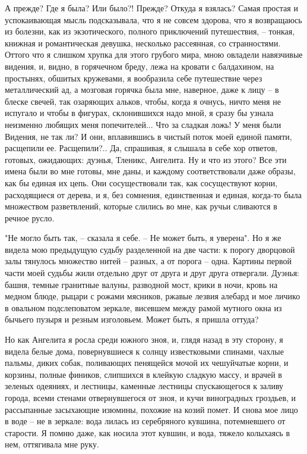 А прежде? Где я была?  Или  было?!  Прежде?  Откуда  я  взялась?  Самая
простая  и  успокаивающая мысль подсказывала, что я не совсем здорова, что я
возвращаюсь  из  болезни,  как   из   экзотического,   полного   приключений
путешествия,   --   тонкая,   книжная  и  романтическая  девушка,  несколько
рассеянная, со странностями. Оттого что я слишком хрупка для  этого  грубого
мира,  мною  овладели навязчивые видения, и, видно, в горячечном бреду, лежа
на кровати с балдахином, на простынях, обшитых кружевами, я вообразила  себе
путешествие  через  металлический ад, а мозговая горячка была мне, наверное,
даже к лицу -- в блеске свечей, так озаряющих альков, чтобы, когда я очнусь,
ничто меня не испугало и чтобы в фигурах, склонившихся надо мной, я сразу бы
узнала неизменно любящих меня попечителей... Что за  сладкая  ложь!  У  меня
были  Видения,  не  так  ли?  И  они, вплавившись в чистый поток моей единой
памяти, расщепили ее. Расщепили?.. Да,  спрашивая,  я  слышала  в  себе  хор
ответов,  готовых,  ожидающих: дуэнья, Тленикс, Ангелита. Ну и что из этого?
Все эти имена были во мне готовы, мне даны, и каждому  соответствовали  даже
образы,  как  бы  единая  их  цепь. Они сосуществовали так, как сосуществуют
корни, расходящиеся от дерева, и я, без  сомнения,  единственная  и  единая,
когда-то  была  множеством  разветвлений,  которые слились во мне, как ручьи
сливаются в речное русло.

"Не могло быть так, -- сказала я себе. -- Не может быть, я уверена". Но
я же видела мою  предыдущую  судьбу  разделенной  на  две  части:  к  порогу
дворцовой  залы  тянулось  множество  нитей  -- разных, а от порога -- одна.
Картины первой части моей судьбы жили отдельно друг от друга  и  друг  друга
отвергали.  Дуэнья:  башня, темные гранитные валуны, разводной мост, крики в
ночи, кровь на медном блюде, рыцари с рожами мясников, ржавые лезвия алебард
и мое личико в овальном подслеповатом зеркале, висевшем между рамой  мутного
окна из бычьего пузыря и резным изголовьем. Может быть, я пришла оттуда?

Но  как  Ангелита  я  росла  среди  южного  зноя,  и, глядя назад в эту
сторону, я видела белые дома, повернувшиеся к солнцу  известковыми  спинами,
чахлые  пальмы, диких собак, поливающих пенящейся мочой их чешуйчатые корни,
и корзины, полные фиников, слипшихся в клейкую сладкую  массу,  и  врачей  в
зеленых  одеяниях,  и  лестницы,  каменные  лестницы  спускающегося к заливу
города, всеми стенами отвернувшегося от зноя, и кучи виноградных гроздьев, и
рассыпанные засыхающие изюмины, похожие на козий помет. И снова мое  лицо  в
воде  --  не  в зеркале: вода лилась из серебряного кувшина, потемневшего от
старости. Я помню даже, как носила этот кувшин, и вода, тяжело  колыхаясь  в
нем, оттягивала мне руку.


